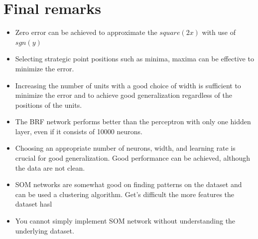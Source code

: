 \documentclass[a4paper]{article}
\begin{document}
\section{Final remarks}
\begin{itemize}
    
    \item Zero error can be achieved to approximate the $square(2x)$ with use of $sgn(y)$
    
    
    \item Selecting strategic point positions such as minima, maxima can be effective to minimize the error. 
    
    \item Increasing the number of units with a good choice of width is sufficient to minimize the error and to achieve good generalization regardless of the positions of the units.
    
    \item The BRF network performs better than the perceptron with only one hidden layer, even if it consists of 10000 neurons.
    
    \item Choosing an appropriate number of neurons, width, and learning rate is crucial for good generalization. Good performance can be achieved, although the data are not clean. 
    
    \item SOM networks are somewhat good on finding patterns on the dataset and can be used a clustering algorithm. Get's difficult the more features the dataset hasl

    \item You cannot simply implement SOM network without understanding the underlying dataset. 
    

\end{itemize}
\end{document}
